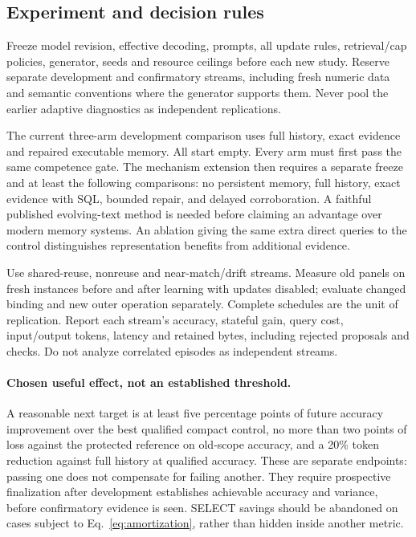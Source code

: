 \documentclass[10pt,twocolumn]{article}
\begin{document}
\subsection{Experiment and decision rules}
Freeze model revision, effective decoding, prompts, all update rules,
retrieval/cap policies, generator, seeds and resource ceilings before each new
study. Reserve separate development and confirmatory streams, including fresh
numeric data and semantic conventions where the generator supports them.
Never pool the earlier adaptive diagnostics as independent replications.

The current three-arm development comparison uses full history, exact evidence
and repaired executable memory. All start empty. Every arm must first pass the
same competence gate. The mechanism extension then requires a separate freeze
and at least the following comparisons: no persistent memory, full history,
exact evidence with SQL, bounded repair, and delayed corroboration. A faithful
published evolving-text method is needed before claiming an advantage over
modern memory systems. An ablation giving the same extra direct queries to the
control distinguishes representation benefits from additional evidence.

Use shared-reuse, nonreuse and near-match/drift streams. Measure old panels on
fresh instances before and after learning with updates disabled; evaluate
changed binding and new outer operation separately. Complete schedules are the
unit of replication. Report each stream's accuracy, stateful gain, query cost,
input/output tokens, latency and retained bytes, including rejected proposals
and checks. Do not analyze correlated episodes as independent streams.

\paragraph{Chosen useful effect, not an established threshold.}
A reasonable next target is at least five percentage points of future accuracy
improvement over the best qualified compact control, no more than two points
of loss against the protected reference on old-scope accuracy, and a 20\%
token reduction against full history at qualified accuracy. These are separate
endpoints: passing one does not compensate for failing another. They require
prospective finalization after development establishes achievable accuracy and
variance, before confirmatory evidence is seen. SELECT savings should be
abandoned on cases subject to Eq.~\eqref{eq:amortization}, rather than hidden
inside another metric.
\end{document}
